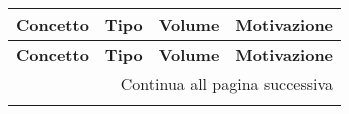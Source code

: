 \small
\setlength\extrarowheight{2pt}
\begin{longtable}{|l|c|c|p{6.2cm}|}
    \hline \textbf{Concetto} & \textbf{Tipo} & \textbf{Volume} & \textbf{Motivazione}                                                                                                                         \\\hline
    \endfirsthead

    \hline \textbf{Concetto} & \textbf{Tipo} & \textbf{Volume} & \textbf{Motivazione}                                                                                                                         \\\hline
    \endhead

    \hline \multicolumn{4}{|r|}{{Continua all pagina successiva}}                                                                                                                                             \\\hline
    \endfoot


\end{longtable}
